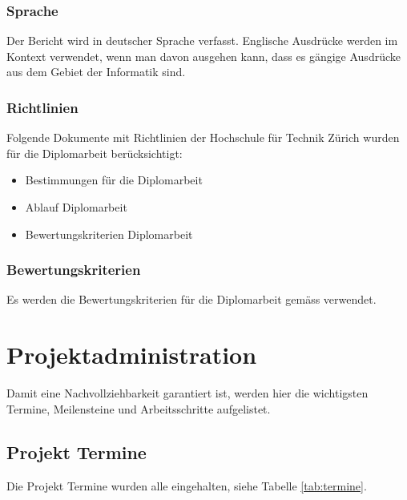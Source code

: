 \documentclass[abstracton, listof=totocnumbered,
bibliography=totocnumbered]{scrreprt}
\begin{document}
  \subsection{Sprache}
  
  Der Bericht wird in deutscher Sprache verfasst. Englische Ausdrücke werden im
  Kontext verwendet, wenn man davon ausgehen kann, dass es gängige Ausdrücke aus
  dem Gebiet der Informatik sind.
    
  \subsection{Richtlinien}
  Folgende Dokumente mit Richtlinien der Hochschule für Technik Zürich wurden
  für die Diplomarbeit berücksichtigt:

  \begin{itemize}
      \item Bestimmungen für die Diplomarbeit \cite{hsz_reglement}
      \item Ablauf Diplomarbeit \cite{hsz_ablauf}
      \item Bewertungskriterien Diplomarbeit \cite{hsz_bewertungskriterien}
  \end{itemize} 
    
  \subsection{Bewertungskriterien}
  
  Es werden die Bewertungskriterien für die Diplomarbeit gemäss
  \cite{hsz_bewertungskriterien} verwendet.
  
  \newpage
  
  \chapter{Projektadministration}
  
  Damit eine Nachvollziehbarkeit garantiert ist, werden hier die wichtigsten
  Termine, Meilensteine und Arbeitsschritte aufgelistet.
  
  \section{Projekt Termine}
  
  Die Projekt Termine wurden alle eingehalten, siehe Tabelle \ref{tab:termine}.
  \newline
  
\end{document}
